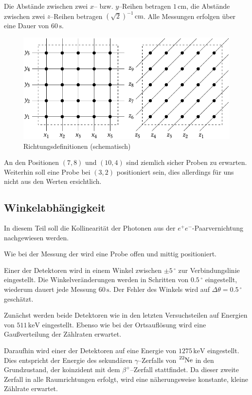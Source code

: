 \documentclass[12pt,a4paper]{scrartcl}
\numberwithin{equation}{section} %
\newcommand{\pu}[1]{\ensuremath{\mathrm{#1}}}
\begin{document}
Die Abstände zwischen zwei $x$-- bzw. $y$--Reihen betragen $\pu{1\,cm}$, die Abstände zwischen zwei $z$--Reihen betragen $(\sqrt{2})^{-1}\,\mathrm{cm}$. Alle Messungen erfolgen über eine Dauer von $60\,\mathrm{s}$.

\begin{figure}[h]
	\centering
	\includegraphics{../media/B3.4/Box_Axis.pdf}
	\caption{Richtungsdefinitionen (schematisch) \cite{UzK}}
	\label{abb:TruheRichtungen}
\end{figure}

An den Positionen $(7,8)$ und $(10,4)$ sind ziemlich sicher Proben zu erwarten. Weiterhin soll eine Probe bei $(3, 2)$ positioniert sein, dies allerdings für uns nicht aus den Werten ersichtlich.

\subsection{Winkelabhängigkeit}
In diesem Teil soll die Kollinearität der Photonen aus der $e^+e^-$-Paarvernichtung nachgewiesen werden.

Wie bei der Messung der  wird eine Probe offen und mittig positioniert.

Einer der Detektoren wird in einem Winkel zwischen $\pm 5\,^\circ$ zur Verbindungslinie eingestellt. Die Winkelveränderungen werden in Schritten von $0.5\,^\circ$ eingestellt, wiederum dauert jede Messung $60\,\mathrm{s}$. Der Fehler des Winkels wird auf $\Delta \theta = \pu{0.5\,^\circ}$ geschätzt.

Zunächst werden beide Detektoren wie in den letzten Versuchsteilen auf Energien von $\pu{511\,keV}$ eingestellt. Ebenso wie bei der Ortsauflösung wird eine Gaußverteilung der Zählraten erwartet.

Daraufhin wird einer der Detektoren auf eine Energie von $\pu{1275\,keV}$ eingestellt. Dies entspricht der Energie des sekundären $\gamma$--Zerfalls von $\ce{^{22}Ne}$ in den Grundzustand, der koinzident mit dem $\beta^+$--Zerfall stattfindet. Da dieser zweite Zerfall in alle Raumrichtungen erfolgt, wird eine näherungsweise konstante, kleine Zählrate erwartet.
\end{document}
